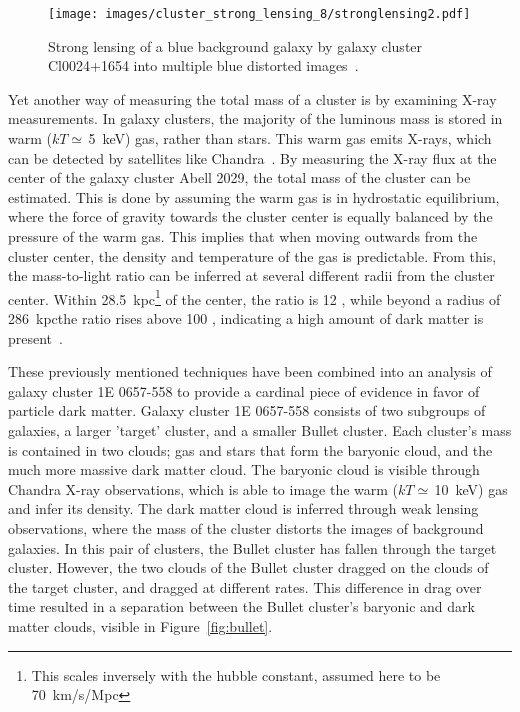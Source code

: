 \begin{figure}
  \centering
  \texttt{[image: images/cluster\_strong\_lensing\_8/stronglensing2.pdf]}
  \caption[Gravitational Lensing in Cl0024+1654]{
    Strong lensing of a blue background galaxy by galaxy cluster Cl0024+1654 into multiple blue distorted images~\cite{cluster_strong_lensing_1996}.
  }
  \label{fig:stronglens}
\end{figure}
    
Yet another way of measuring the total mass of a cluster is by examining X-ray measurements.
In galaxy clusters, the majority of the luminous mass is stored in warm ($kT\simeq\,$\SI{5}{keV}) gas, rather than stars.
This warm gas emits X-rays, which can be detected by satellites like Chandra~\cite{chandra}.
By measuring the X-ray flux at the center of the galaxy cluster Abell 2029, the total mass of the cluster can be estimated.
This is done by assuming the warm gas is in hydrostatic equilibrium, where the force of gravity towards the cluster center is equally balanced by the pressure of the warm gas.
This implies that when moving outwards from the cluster center, the density and temperature of the gas is predictable.
From this, the mass-to-light ratio can be inferred at several different radii from the cluster center.
Within \SI{28.5}{kpc}\footnote[2]{This scales inversely with the hubble constant, assumed here to be \SI{70}{km/s/Mpc}} of the center, the ratio is 12 \MLsol, while beyond a radius of \SI{286}{kpc}\footnotemark[2] the ratio rises above 100 \MLsol{}, indicating a high amount of dark matter is present~\cite{cluster_chandra}.

These previously mentioned techniques have been combined into an analysis of galaxy cluster 1E 0657-558 to provide a cardinal piece of evidence in favor of particle dark matter.
Galaxy cluster 1E 0657-558 consists of two subgroups of galaxies, a larger 'target' cluster, and a smaller Bullet cluster.
Each cluster's mass is contained in two clouds; gas and stars that form the baryonic cloud, and the much more massive dark matter cloud.
The baryonic cloud is visible through Chandra X-ray observations, which is able to image the warm ($kT\simeq\,$\SI{10}{keV}) gas and infer its density.
The dark matter cloud is inferred through weak lensing observations, where the mass of the cluster distorts the images of background galaxies.
In this pair of clusters, the Bullet cluster has fallen through the target cluster.
However, the two clouds of the Bullet cluster dragged on the clouds of the target cluster, and dragged at different rates.
This difference in drag over time resulted in a separation between the Bullet cluster's baryonic and dark matter clouds, visible in Figure~\ref{fig:bullet}.

